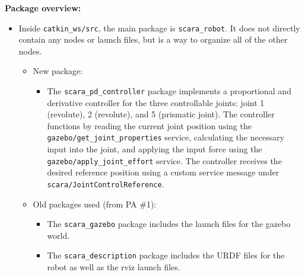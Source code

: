 \documentclass[10pt]{article}
\begin{document}
\setlength{\abovedisplayskip}{6pt}
\setlength{\belowdisplayskip}{3pt}
\setlength{\abovedisplayshortskip}{4pt}
\setlength{\belowdisplayshortskip}{4pt}

\textbf{Package overview:}
\begin{itemize}
	\item Inside \texttt{catkin\_ws/src}, the main package is \texttt{scara\_robot}. It does not directly contain any nodes or launch files, but is a way to organize all of the other nodes.
	\begin{itemize}
		\item New package:
		\begin{itemize}
			\item The \texttt{scara\_pd\_controller} package implements a proportional and derivative controller for the three controllable joints: joint 1 (revolute), 2 (revolute), and 5 (prismatic joint). The controller functions by reading the current joint position using the \\ \texttt{gazebo/get\_joint\_properties} service, calculating the necessary input into the joint, and applying the input force using the \texttt{gazebo/apply\_joint\_effort} service. The controller receives the desired reference position using a custom service message under \texttt{scara/JointControlReference}.
		\end{itemize}
		
		\item Old packages used (from PA \#1):
		\begin{itemize}
			\item The \texttt{scara\_gazebo} package includes the launch files for the gazebo world.
			\item The \texttt{scara\_description} package includes the URDF files for the robot as well as the rviz launch files.
		\end{itemize}
	\end{itemize}
\end{itemize}
\vspace{0.5cm}
\end{document}
